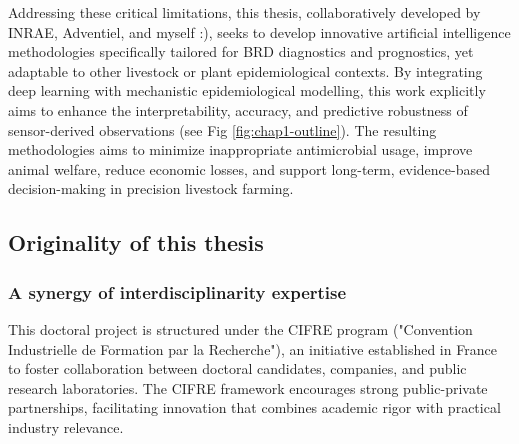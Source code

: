 Addressing these critical limitations, this thesis, collaboratively developed by INRAE, Adventiel, and myself :), seeks to develop innovative artificial intelligence methodologies specifically tailored for BRD diagnostics and prognostics, yet adaptable to other livestock or plant epidemiological contexts. By integrating deep learning with mechanistic epidemiological modelling, this work explicitly aims to enhance the interpretability, accuracy, and predictive robustness of sensor-derived observations (see Fig \ref{fig:chap1-outline}). The resulting methodologies aims to minimize inappropriate antimicrobial usage, improve animal welfare, reduce economic losses, and support long-term, evidence-based decision-making in precision livestock farming.




\subsection{Originality of this thesis}

\subsubsection*{A synergy of interdisciplinarity expertise}

This doctoral project is structured under the CIFRE program ("Convention Industrielle de Formation par la Recherche"), an initiative established in France to foster collaboration between doctoral candidates, companies, and public research laboratories. The CIFRE framework encourages strong public-private partnerships, facilitating innovation that combines academic rigor with practical industry relevance.

